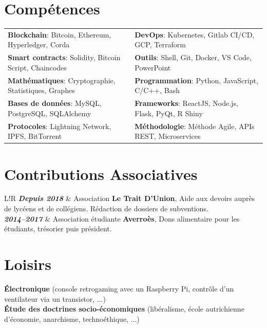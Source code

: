 \documentclass[10pt]{article}
\newcommand\VRule{\color{lightgray}\vrule width 2pt}
\begin{document}
\section*{Compétences}
\begin{tabular}{ l l }
\textbf{Blockchain}: Bitcoin, Ethereum, Hyperledger, Corda & \textbf{DevOps}: Kubernetes, Gitlab CI/CD, GCP, Terraform \\[0.1cm]
\textbf{Smart contracts}: Solidity, Bitcoin Script, Chaincodes & \textbf{Outils}: Shell, Git, Docker, VS Code, PowerPoint \\[0.1cm]
\textbf{Mathématiques}: Cryptographie, Statistiques, Graphes & \textbf{Programmation}: Python, JavaScript, C/C++, Bash  \\[0.1cm]
\textbf{Bases de données}: MySQL, PostgreSQL, SQLAlchemy & \textbf{Frameworks}: ReactJS, Node.js, Flask, PyQt, R Shiny \\[0.1cm]
\textbf{Protocoles}: Lightning Network, IPFS, BitTorrent & \textbf{Méthodologie}: Méthode Agile, APIs REST, Microservices \\[0.1cm]
\end{tabular}

\section*{Contributions Associatives}
\begin{tabular}{L!{\VRule}R}
\textbf{\textit{Depuis 2018}} & Association \textbf{Le Trait D’Union}, Aide aux devoirs auprès de lycéens et de collégiens. Rédaction de dossiers de subventions. \\[0.75cm]

\textbf{\textit{2014--2017}} & Association étudiante \textbf{Averroès}, Dons alimentaire pour les étudiants, trésorier puis président. \\
\end{tabular}
\section*{Loisirs}
\hspace*{1ex} \textbf{Électronique} (console retrogaming avec un Raspberry Pi, contrôle d'un ventilateur via un transistor, ...) \\
\hspace*{1ex} \textbf{Étude des doctrines socio-économiques} (libéralisme, école autrichienne d'économie, anarchisme, technoéthique, ...) \\
\end{document}
